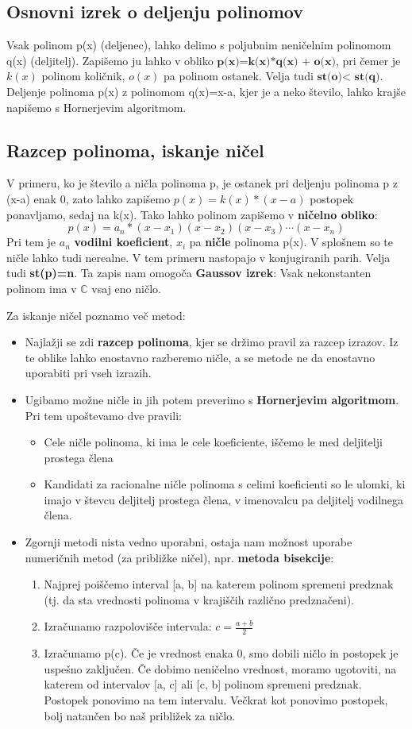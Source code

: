 \subsection{Osnovni izrek o deljenju polinomov}
Vsak polinom p(x) (deljenec), lahko delimo s poljubnim neničelnim polinomom q(x) (deljitelj). Zapišemo ju lahko v obliko $\textbf{p(x)=k(x)*q(x) + o(x)}$, pri čemer je $k(x)$ polinom količnik, $o(x)$ pa polinom ostanek. Velja tudi $\textbf{st(o)< st(q)}$. Deljenje polinoma p(x) z polinomom q(x)=x-a, kjer je a neko število, lahko krajše napišemo s Hornerjevim algoritmom.
\subsection{Razcep polinoma, iskanje ničel}
V primeru, ko je število a ničla polinoma p, je ostanek pri deljenju polinoma p z (x-a) enak 0, zato lahko zapišemo $p(x)= k(x)*(x-a)$ postopek ponavljamo, sedaj na k(x). Tako lahko polinom zapišemo v \textbf{ničelno obliko}: 
\[
p(x)= a_n*(x-x_1)(x-x_2)(x-x_3)\cdots(x-x_n)
\]
Pri tem je $a_n$ \textbf{vodilni koeficient}, $x_i$ pa \textbf{ničle} polinoma p(x). V splošnem so te ničle lahko tudi nerealne. V tem primeru nastopajo v konjugiranih parih. Velja tudi \textbf{st(p)=n}. Ta zapis nam omogoča \textbf{Gaussov izrek}: Vsak nekonstanten polinom ima v $\mathbb{C}$ vsaj eno ničlo.

Za iskanje ničel poznamo več metod:
\begin{itemize}
\item Najlažji se zdi \textbf{razcep polinoma}, kjer se držimo pravil za razcep izrazov. Iz te oblike lahko enostavno razberemo ničle, a se metode ne da enostavno uporabiti pri vseh izrazih.
\item Ugibamo možne ničle in jih potem preverimo s \textbf{Hornerjevim algoritmom}. Pri tem upoštevamo dve pravili: 
\begin{itemize}
\item Cele ničle polinoma, ki ima le cele koeficiente, iščemo le med deljitelji prostega člena 
\item Kandidati za racionalne ničle polinoma s celimi koeficienti so le ulomki, ki imajo v števcu deljitelj prostega člena, v imenovalcu pa deljitelj vodilnega člena.
\end{itemize}
\item Zgornji metodi nista vedno uporabni, ostaja nam možnost uporabe numeričnih metod (za približke ničel), npr. \textbf{metoda bisekcije}:\begin{enumerate}
\item Najprej poiščemo interval [a, b] na katerem polinom spremeni predznak (tj. da sta vrednosti polinoma v krajiščih različno predznačeni).
\item Izračunamo razpolovišče intervala: $c=\frac{a+b}{2}$
\item Izračunamo p(c). Če je vrednost enaka 0, smo dobili ničlo in postopek je uspešno zaključen. Če dobimo neničelno vrednost, moramo ugotoviti, na katerem od intervalov [a, c] ali [c, b] polinom spremeni predznak. Postopek ponovimo na tem intervalu. Večkrat kot ponovimo postopek, bolj natančen bo naš približek za ničlo. 
\end{enumerate}
\end{itemize}

